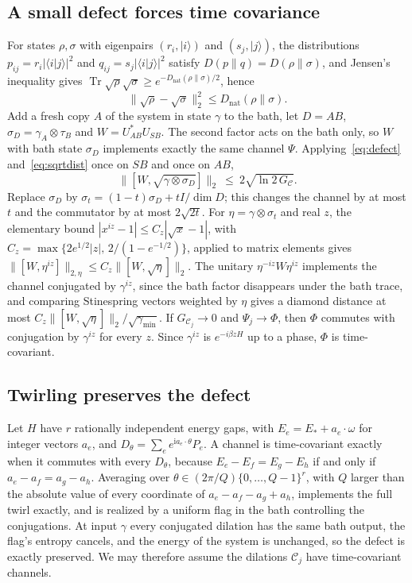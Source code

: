 \documentclass[11pt]{article}
\theoremstyle{definition}
\theoremstyle{remark}
\newcommand{\Tr}{\operatorname{Tr}}
\newcommand{\Dil}{\mathcal C}
\begin{document}
\subsection{A small defect forces time covariance}

For states $\rho,\sigma$ with eigenpairs $(r_i,|i\rangle)$ and $(s_j,|j\rangle)$, the distributions $p_{ij}=r_i|\langle i|j\rangle|^2$ and $q_{ij}=s_j|\langle i|j\rangle|^2$ satisfy $D(p\|q)=D(\rho\|\sigma)$, and Jensen's inequality gives $\Tr\sqrt\rho\sqrt\sigma\ge e^{-D_{\mathrm{nat}}(\rho\|\sigma)/2}$, hence
\begin{equation}\label{eq:sqrtdist}
\|\sqrt\rho-\sqrt\sigma\|_2^2\le D_{\mathrm{nat}}(\rho\|\sigma).
\end{equation}
Add a fresh copy $A$ of the system in state $\gamma$ to the bath, let $D=AB$, $\sigma_D=\gamma_A\otimes\tau_B$ and $W=U_{AB}^*U_{SB}$. The second factor acts on the bath only, so $W$ with bath state $\sigma_D$ implements exactly the same channel $\Psi$. Applying~\eqref{eq:defect} and~\eqref{eq:sqrtdist} once on $SB$ and once on $AB$,
\begin{equation}\label{eq:commutator}
\bigl\|[W,\sqrt{\gamma\otimes\sigma_D}]\bigr\|_2\ \le\ 2\sqrt{\ln2\,G_{\Dil}}.
\end{equation}
Replace $\sigma_D$ by $\sigma_t=(1-t)\sigma_D+tI/\dim D$; this changes the channel by at most $t$ and the commutator by at most $2\sqrt{2t}$. For $\eta=\gamma\otimes\sigma_t$ and real $z$, the elementary bound $|x^{iz}-1|\le C_z|\sqrt x-1|$, with $C_z=\max\{2e^{1/2}|z|,\,2/(1-e^{-1/2})\}$, applied to matrix elements gives $\|[W,\eta^{iz}]\|_{2,\eta}\le C_z\|[W,\sqrt\eta]\|_2$. The unitary $\eta^{-iz}W\eta^{iz}$ implements the channel conjugated by $\gamma^{iz}$, since the bath factor disappears under the bath trace, and comparing Stinespring vectors weighted by $\eta$ gives a diamond distance at most $C_z\|[W,\sqrt\eta]\|_2/\sqrt{\gamma_{\min}}$. If $G_{\Dil_j}\to0$ and $\Psi_j\to\Phi$, then $\Phi$ commutes with conjugation by $\gamma^{iz}$ for every $z$. Since $\gamma^{iz}$ is $e^{-i\beta zH}$ up to a phase, $\Phi$ is time-covariant.

\subsection{Twirling preserves the defect}

Let $H$ have $r$ rationally independent energy gaps, with $E_e=E_*+a_e\cdot\omega$ for integer vectors $a_e$, and $D_\theta=\sum_ee^{\mathrm ia_e\cdot\theta}P_e$. A channel is time-covariant exactly when it commutes with every $D_\theta$, because $E_e-E_f=E_g-E_h$ if and only if $a_e-a_f=a_g-a_h$. Averaging over $\theta\in(2\pi/Q)\{0,\dots,Q-1\}^r$, with $Q$ larger than the absolute value of every coordinate of $a_e-a_f-a_g+a_h$, implements the full twirl exactly, and is realized by a uniform flag in the bath controlling the conjugations. At input $\gamma$ every conjugated dilation has the same bath output, the flag's entropy cancels, and the energy of the system is unchanged, so the defect is exactly preserved. We may therefore assume the dilations $\Dil_j$ have time-covariant channels.
\end{document}
